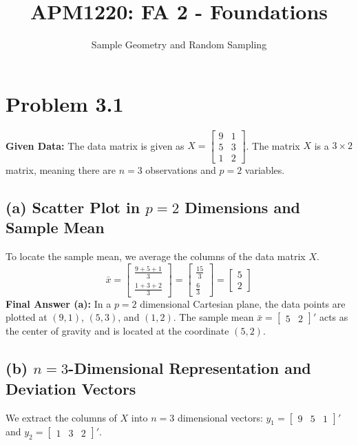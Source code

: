 \documentclass[12pt]{article}
\title{APM1220: FA 2 - Foundations}
\author{Sample Geometry and Random Sampling}
\date{}
\begin{document}
\maketitle

\section*{Problem 3.1}
\textbf{Given Data:} The data matrix is given as 
$X = \begin{bmatrix} 9 & 1 \\ 5 & 3 \\ 1 & 2 \end{bmatrix}$. 
The matrix $X$ is a $3 \times 2$ matrix, meaning there are $n=3$ observations and $p=2$ variables.

\subsection*{(a) Scatter Plot in $p=2$ Dimensions and Sample Mean}
To locate the sample mean, we average the columns of the data matrix $X$.
$$ \bar{x} = \begin{bmatrix} \frac{9+5+1}{3} \\ \frac{1+3+2}{3} \end{bmatrix} = \begin{bmatrix} \frac{15}{3} \\ \frac{6}{3} \end{bmatrix} = \begin{bmatrix} 5 \\ 2 \end{bmatrix} $$
\textbf{Final Answer (a):} In a $p=2$ dimensional Cartesian plane, the data points are plotted at $(9, 1)$, $(5, 3)$, and $(1, 2)$. The sample mean $\bar{x} = \begin{bmatrix} 5 & 2 \end{bmatrix}'$ acts as the center of gravity and is located at the coordinate $(5, 2)$.

\subsection*{(b) $n=3$-Dimensional Representation and Deviation Vectors}
We extract the columns of $X$ into $n=3$ dimensional vectors: 
$y_1 = \begin{bmatrix} 9 & 5 & 1 \end{bmatrix}'$ and $y_2 = \begin{bmatrix} 1 & 3 & 2 \end{bmatrix}'$. 
\end{document}
